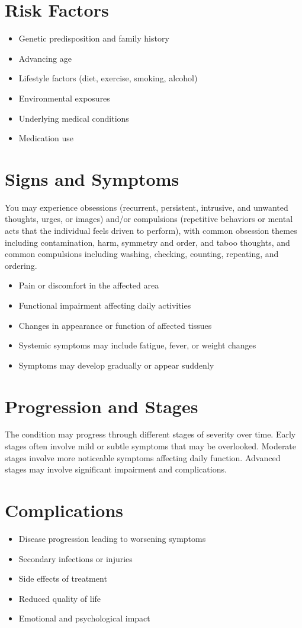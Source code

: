 \section{Risk Factors}
\begin{itemize}[noitemsep]
  \item Genetic predisposition and family history
  \item Advancing age
  \item Lifestyle factors (diet, exercise, smoking, alcohol)
  \item Environmental exposures
  \item Underlying medical conditions
  \item Medication use
\end{itemize}
\section{Signs and Symptoms}
You may experience obsessions (recurrent, persistent, intrusive, and unwanted thoughts, urges, or images) and/or compulsions (repetitive behaviors or mental acts that the individual feels driven to perform), with common obsession themes including contamination, harm, symmetry and order, and taboo thoughts, and common compulsions including washing, checking, counting, repeating, and ordering.

\begin{itemize}[noitemsep]
  \item Pain or discomfort in the affected area
  \item Functional impairment affecting daily activities
  \item Changes in appearance or function of affected tissues
  \item Systemic symptoms may include fatigue, fever, or weight changes
  \item Symptoms may develop gradually or appear suddenly
\end{itemize}
\section{Progression and Stages}
The condition may progress through different stages of severity over time. Early stages often involve mild or subtle symptoms that may be overlooked. Moderate stages involve more noticeable symptoms affecting daily function. Advanced stages may involve significant impairment and complications.
\section{Complications}
\begin{itemize}[noitemsep]
  \item Disease progression leading to worsening symptoms
  \item Secondary infections or injuries
  \item Side effects of treatment
  \item Reduced quality of life
  \item Emotional and psychological impact
\end{itemize}
